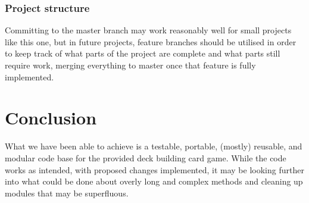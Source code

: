 \documentclass[12pt,a4paper,tightenlines]{article}
\begin{document}
\subsubsection{Project structure}
Committing to the master branch may work reasonably well for small projects like this one,
but in future projects, feature branches should be utilised in order to keep track of
what parts of the project are complete and what parts still require work, merging
everything to master once that feature is fully implemented.

\section{Conclusion}
What we have been able to achieve is a testable, portable, (mostly) reusable,
and modular code base for the provided deck building card game. While the
code works as intended, with proposed changes implemented, it may be looking
further into what could be done about overly long and complex methods
and cleaning up modules that may be superfluous.

%
\end{document}

